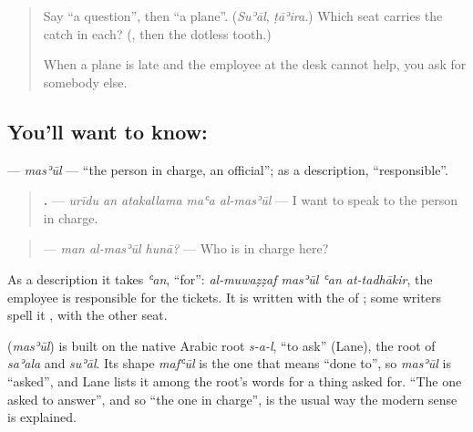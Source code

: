 \label{lesson:AR-C288-masul}



\begin{quote}
Say \textquotedblleft{}a question\textquotedblright{}, then \textquotedblleft{}a plane\textquotedblright{}. (\emph{Suʾāl}, \emph{ṭāʾira}.) Which seat carries the catch in each? (\textbf{}, then the dotless tooth.)

When a plane is late and the employee at the desk cannot help, you ask for somebody else.
\end{quote}

\subsection*{You'll want to know: }
\textbf{} — \emph{masʾūl} — \textquotedblleft{}the person in charge, an official\textquotedblright{}; as a description, \textquotedblleft{}responsible\textquotedblright{}.

\begin{quote}
\textbf{    .} — \emph{urīdu an atakallama maʿa al-masʾūl} — I want to speak to the person in charge.
\end{quote}

\begin{quote}
\textbf{  } — \emph{man al-masʾūl hunā?} — Who is in charge here?
\end{quote}

As a description it takes \emph{ʿan}, \textquotedblleft{}for\textquotedblright{}: \emph{al-muwaẓẓaf masʾūl ʿan at-tadhākir}, the employee is responsible for the tickets. It is written with the \textbf{} of \textbf{}; some writers spell it \textbf{}, with the other seat.

\begin{cousinweb}
\textbf{} (\emph{masʾūl}) is built on the native Arabic root \emph{s-a-l}, \textquotedblleft{}to ask\textquotedblright{} (Lane), the root of \emph{saʾala} and \emph{suʾāl}. Its shape \emph{mafʿūl} is the one that means \textquotedblleft{}done to\textquotedblright{}, so \emph{masʾūl} is \textquotedblleft{}asked\textquotedblright{}, and Lane lists it among the root's words for a thing asked for. \textquotedblleft{}The one asked to answer\textquotedblright{}, and so \textquotedblleft{}the one in charge\textquotedblright{}, is the usual way the modern sense is explained.
\end{cousinweb}

